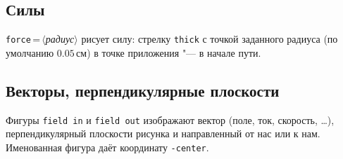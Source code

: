 \documentclass[a4paper,11pt]{article}
\newcommand\key[1]{\texttt{#1}}
\newcommand\meta[1]{\ensuremath{\langle}\textit{#1}\ensuremath{\rangle}}
\begin{document}
\subsection{Силы}\label{sec:forces}
\key{force}\,=\,\meta{радиус} рисует силу: стрелку \key{thick} с точкой
заданного радиуса (по умолчанию \(0.05\,\text{см}\)) в точке приложения "---
в начале пути.
\begin{example}
\end{example}

\subsection{Векторы, перпендикулярные плоскости}
Фигуры \texttt{field in} и \texttt{field out} изображают вектор (поле, ток,
скорость, \ldots), перпендикулярный плоскости рисунка и направленный от нас
или к нам. Именованная фигура даёт координату \texttt{-center}.
\begin{example}
\end{example}
\end{document}
